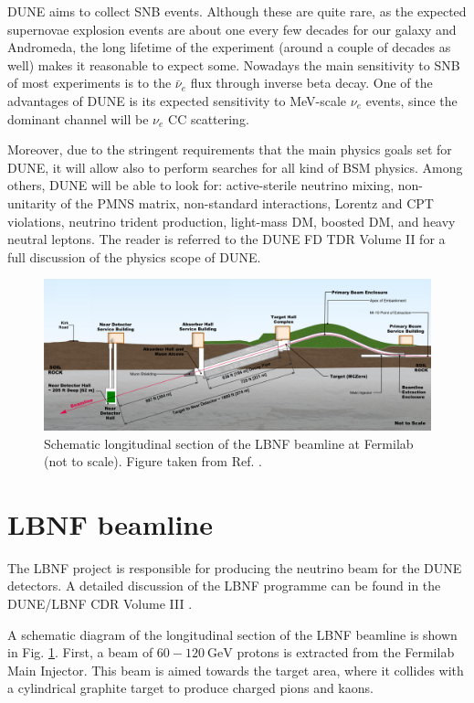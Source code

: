 DUNE aims to collect SNB events. Although these are quite rare, as the expected supernovae explosion events are about one every few decades for our galaxy and Andromeda, the long lifetime of the experiment (around a couple of decades as well) makes it reasonable to expect some. Nowadays the main sensitivity to SNB of most experiments is to the $\bar{\nu}_{e}$ flux through inverse beta decay. One of the advantages of DUNE is its expected sensitivity to MeV-scale $\nu_{e}$ events, since the dominant channel will be $\nu_{e}$ CC scattering.

Moreover, due to the stringent requirements that the main physics goals set for DUNE, it will allow also to perform searches for all kind of BSM physics. Among others, DUNE will be able to look for: active-sterile neutrino mixing, non-unitarity of the PMNS matrix, non-standard interactions, Lorentz and CPT violations, neutrino trident production, light-mass DM, boosted DM, and heavy neutral leptons. The reader is referred to the DUNE FD TDR Volume II \cite{DUNE2020TDR2} for a full discussion of the physics scope of DUNE.

\begin{figure}[t]
	\centering
	\includegraphics[width=0.95\linewidth]{Images/DUNE/LBNF/beamline-sideview}
	\caption[Schematic longitudinal section of the LBNF beamline at Fermilab.]{Schematic longitudinal section of the LBNF beamline at Fermilab (not to scale). Figure taken from Ref. \cite{DUNE2016CDR3}.}
	\label{fig:lbnf_beamline}
\end{figure}

\section{LBNF beamline}

The LBNF project is responsible for producing the neutrino beam for the DUNE detectors. A detailed discussion of the LBNF programme can be found in the DUNE/LBNF CDR Volume III \cite{DUNE2016CDR3}.

A schematic diagram of the longitudinal section of the LBNF beamline is shown in Fig. \ref{fig:lbnf_beamline}. First, a beam of $60-120~\mathrm{GeV}$ protons is extracted from the Fermilab Main Injector. This beam is aimed towards the target area, where it collides with a cylindrical graphite target to produce charged pions and kaons.

